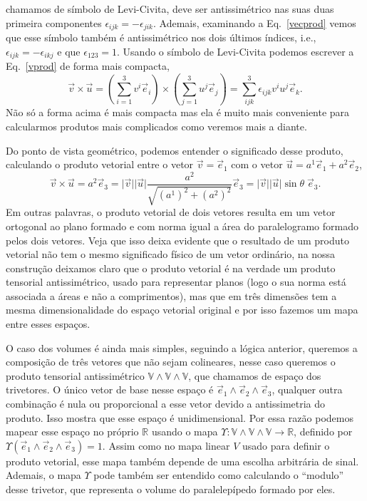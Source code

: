 chamamos de símbolo de Levi-Civita, deve ser antissimétrico nas suas duas
primeira componentes  $\epsilon_{ijk} = -\epsilon_{jik}$. Ademais, examinando a
Eq.~\eqref{vecprod} vemos que esse símbolo também é antissimétrico nos dois
últimos índices, i.e., $\epsilon_{ijk} = -\epsilon_{ikj}$ e que $\epsilon_{123}
	= 1$. Usando o símbolo de Levi-Civita podemos escrever a Eq.~\eqref{vprod} de
forma mais compacta,
\begin{equation}\label{vpe}
	\vec{v}\times\vec{u} = \left(\sum_{i=1}^3v^i\vec{e}_i\right)\times\left(\sum_{j=1}^3u^j\vec{e}_j\right)=\sum_{ijk}^3\epsilon_{ijk}v^iu^j\vec{e}_k.
\end{equation}
Não só a forma acima é mais compacta mas ela é muito mais conveniente para
calcularmos produtos mais complicados como veremos mais a diante.

Do ponto de vista geométrico, podemos entender o significado desse produto,
calculando o produto vetorial entre o vetor $\vec{v} =\vec{e}_1
$ com o vetor $\vec{u} = a^1\vec{e}_1+a^2\vec{e}_2$,
\begin{equation}
	\vec{v}\times\vec{u} = a^2\vec{e}_3 = \vert\vec{v}\vert\vert\vec{u}\vert \frac{a^2}{\sqrt{(a^1)^2+(a^2)^2}}\vec{e}_3 = \vert\vec{v}\vert\vert\vec{u}\vert \sin\theta\;\vec{e}_3.
\end{equation}
Em outras palavras, o produto vetorial de dois vetores resulta em um vetor
ortogonal ao plano formado e com norma igual a área do paralelogramo formado
pelos dois vetores. Veja que isso deixa evidente que o resultado de um produto
vetorial não tem o mesmo significado físico de um vetor ordinário, na nossa
construção deixamos claro que o produto vetorial é na verdade um produto
tensorial antissimétrico, usado para representar planos (logo o sua norma está
associada a áreas e não a comprimentos), mas que em três dimensões tem a mesma
dimensionalidade do espaço vetorial original e por isso fazemos um mapa entre
esses espaços.

O caso dos volumes é ainda mais simples, seguindo a lógica anterior, queremos a
composição de três vetores que não sejam colineares, nesse caso queremos o
produto tensorial antissimétrico $\mathbb{V}\wedge\mathbb{V}\wedge\mathbb{V}$,
que chamamos de espaço dos trivetores. O único vetor de base nesse espaço é
$\vec{e}_1\wedge\vec{e}_2\wedge\vec{e}_3$, qualquer outra combinação é nula ou
proporcional a esse vetor devido a antissimetria do produto. Isso mostra que
esse espaço é unidimensional. Por essa razão podemos mapear esse espaço no
próprio $\mathbb{R}$ usando o mapa $\Upsilon:
	\mathbb{V}\wedge\mathbb{V}\wedge\mathbb{V}\to\mathbb{R}$, definido por
$\Upsilon(\vec{e}_1\wedge\vec{e}_2\wedge\vec{e}_3) =1$. Assim como no mapa
linear $V$ usado para definir o produto vetorial, esse mapa também depende de
uma escolha arbitrária de sinal. Ademais, o mapa $\Upsilon$ pode também ser
entendido como calculando o ``modulo'' desse trivetor, que representa o volume
do paralelepípedo formado por eles.

